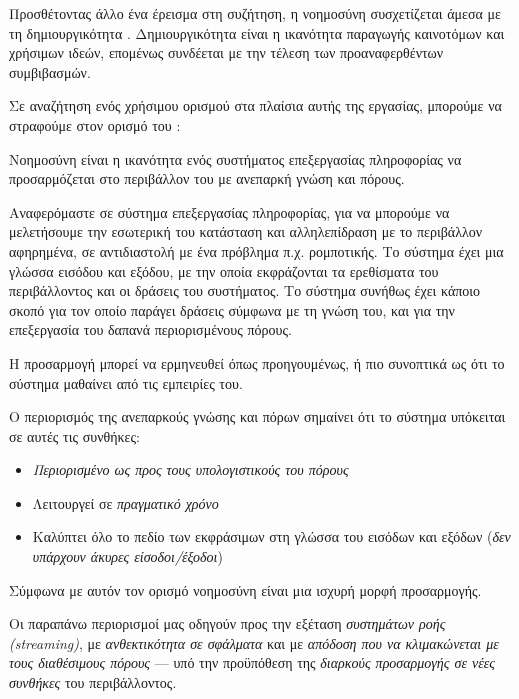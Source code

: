   Προσθέτοντας άλλο ένα έρεισμα στη συζήτηση, η νοημοσύνη συσχετίζεται άμεσα με τη δημιουργικότητα \parencite{benedekIntelligenceCreativityCognitive2014}.
  Δημιουργικότητα είναι η ικανότητα παραγωγής καινοτόμων και χρήσιμων ιδεών,
  επομένως συνδέεται με την τέλεση των προαναφερθέντων συμβιβασμών.
  \bigskip

  Σε αναζήτηση ενός χρήσιμου ορισμού στα πλαίσια αυτής της εργασίας, μπορούμε να στραφούμε στον ορισμό του \cite[Wang][]{wangWorkingDefinitionIntelligence1995}:

  \begin{displayquote}
    Νοημοσύνη είναι η ικανότητα ενός συστήματος επεξεργασίας πληροφορίας να προσαρμόζεται
    στο περιβάλλον του με ανεπαρκή γνώση και πόρους.
  \end{displayquote}

  Αναφερόμαστε σε σύστημα επεξεργασίας πληροφορίας, για να μπορούμε να μελετήσουμε την εσωτερική του κατάσταση και αλληλεπίδραση
  με το περιβάλλον αφηρημένα, σε αντιδιαστολή με ένα πρόβλημα π.χ. ρομποτικής.
  Το σύστημα έχει μια γλώσσα εισόδου και εξόδου, με την οποία εκφράζονται τα ερεθίσματα του περιβάλλοντος και οι δράσεις του συστήματος.
  Το σύστημα συνήθως έχει κάποιο σκοπό για τον οποίο παράγει δράσεις σύμφωνα με τη γνώση του,
  και για την επεξεργασία του δαπανά περιορισμένους πόρους.

  Η προσαρμογή μπορεί να ερμηνευθεί όπως προηγουμένως, ή πιο συνοπτικά ως ότι το σύστημα μαθαίνει από τις εμπειρίες του.

  Ο περιορισμός της ανεπαρκούς γνώσης και πόρων σημαίνει ότι το σύστημα υπόκειται σε αυτές τις συνθήκες:
  \begin{itemize}
    \item \textit{Περιορισμένο ως προς τους υπολογιστικούς του πόρους}
    \item Λειτουργεί σε \textit{πραγματικό χρόνο}
    \item Καλύπτει όλο το πεδίο των εκφράσιμων στη γλώσσα του εισόδων και εξόδων (\textit{δεν υπάρχουν άκυρες είσοδοι/έξοδοι})
  \end{itemize}

  Σύμφωνα με αυτόν τον ορισμό νοημοσύνη είναι μια ισχυρή μορφή προσαρμογής.

  Οι παραπάνω περιορισμοί μας οδηγούν προς την εξέταση \textit{συστημάτων ροής (streaming)}, με \textit{ανθεκτικότητα σε σφάλματα}
  και με \textit{απόδοση που να κλιμακώνεται με τους διαθέσιμους πόρους} --- υπό την προϋπόθεση της \textit{διαρκούς προσαρμογής σε νέες συνθήκες} του περιβάλλοντος.

